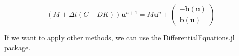 \begin{equation}
    (M+\Delta t(C-DK))\mathbf{u}^{n+1}=M\mathbf{u}^n+\begin{pmatrix}-\mathbf{b}(\mathbf{u}) \\ \mathbf{b}(\mathbf{u})\end{pmatrix}
\end{equation}

If we want to apply other methods, we can use the DifferentialEquations.jl package. 